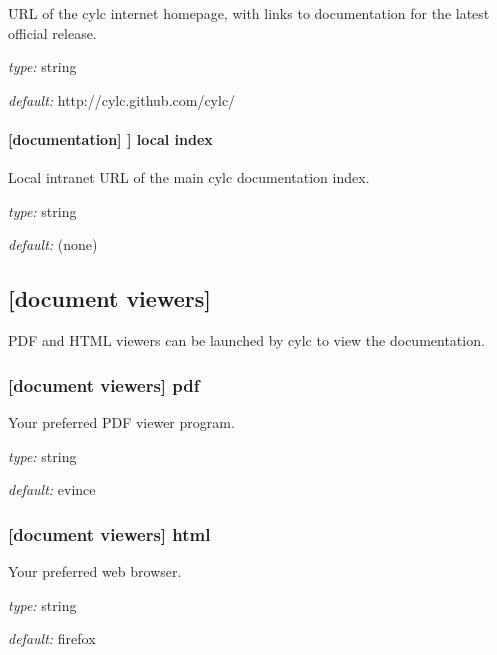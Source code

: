 URL of the cylc internet homepage, with links to documentation for the
latest official release.

\begin{myitemize}
\item {\em type:} string
\item {\em default:} http://cylc.github.com/cylc/
\end{myitemize}

\paragraph[local index]{[documentation] \textrightarrow [[urls]] \textrightarrow local index}

Local intranet URL of the main cylc documentation index.

\begin{myitemize}
\item {\em type:} string
\item {\em default:} (none)
\end{myitemize}

\subsection{[document viewers]}

PDF and HTML viewers can be launched by cylc to view the documentation.

\subsubsection[pdf]{[document viewers] \textrightarrow pdf}

Your preferred PDF viewer program.

\begin{myitemize}
\item {\em type:} string
\item {\em default:} evince
\end{myitemize}

\subsubsection[html]{[document viewers] \textrightarrow html}

Your preferred web browser.

\begin{myitemize}
\item {\em type:} string
\item {\em default:} firefox
\end{myitemize}

